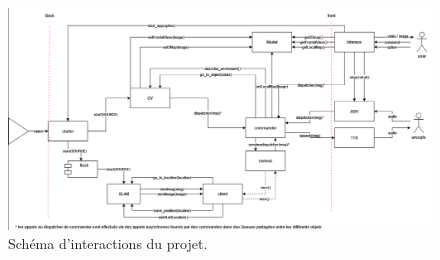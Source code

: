 \documentclass[11pt]{article}
\begin{document}
      \begin{figure}[hbt]  
        \includegraphics[width=\textwidth]{Schéma2.png}    
        \caption{Schéma d'interactions du projet.}
        \label{fig:Schema2}
      \end{figure}

    \clearpage
    \printnoidxglossary[type=acronym, nonumberlist]
    \printacronyms
 
\end{document}

